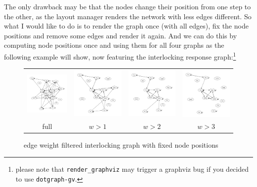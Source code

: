 \documentclass[a4paper]{scrartcl}
\newcommand{\file}[1]{\texttt{\color{file}#1}}
\newcommand{\cmd}[1]{\texttt{\color{cmd}#1}}
\begin{document}
The only drawback may be that the nodes change their position from one
step to the other, as the layout manager renders the network with less
edges different. So what I would like to do is to render the graph
once (with all edges), fix the node positions and remove some edges
and render it again. And we can do this by computing node positions
once and using them for all four graphs as the following example will
show, now featuring the interlocking response graph:\footnote{please
  note that \cmd{render\_graphviz} may trigger a graphviz bug if you
  decided to use \file{dotgraph-gv}.}

\begin{figure}
  \centering
  
  \begin{tabular}{@{}c@{}c@{}c@{}c@{}}
    \includegraphics[width=.25\linewidth]{gv_il0} &
    \includegraphics[width=.25\linewidth]{gv_il1} &
    \includegraphics[width=.25\linewidth]{gv_il2} & 
    \includegraphics[width=.25\linewidth]{gv_il3}\\
    full & $w>1$ & $w>2$ & $w>3$
  \end{tabular}
  \caption{edge weight filtered interlocking graph with fixed node positions}
  \label{fig:il-weightfilter}
\end{figure}
\end{document}
